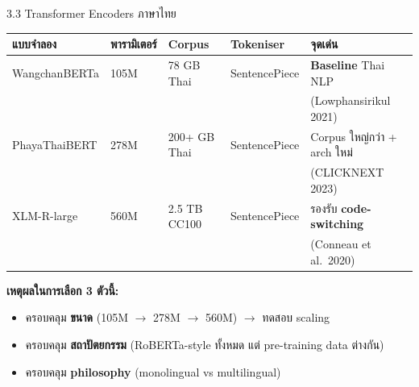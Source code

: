 \documentclass[aspectratio=169,11pt,xcolor=dvipsnames]{beamer}
\newcommand{\hl}[1]{\textcolor{kmitlOrange}{\textbf{#1}}}
\newcommand{\hlb}[1]{\textcolor{kmitlBlue}{\textbf{#1}}}
\begin{document}
\begin{frame}{3.3 Transformer Encoders ภาษาไทย}
  \footnotesize
  \begin{tabular}{p{2.6cm}p{1.6cm}p{1.8cm}p{1.8cm}p{4.5cm}}
    \toprule
    \textbf{แบบจำลอง} & \textbf{พารามิเตอร์} & \textbf{Corpus} & \textbf{Tokeniser} & \textbf{จุดเด่น}\\
    \midrule
    WangchanBERTa & 105M & 78 GB Thai & SentencePiece & \hlb{Baseline} Thai NLP\\
                  &      &            &               & (Lowphansirikul 2021)\\[0.3em]
    PhayaThaiBERT & 278M & 200+ GB Thai & SentencePiece & Corpus ใหญ่กว่า + arch ใหม่\\
                  &      &              &               & (CLICKNEXT 2023)\\[0.3em]
    XLM-R-large   & 560M & 2.5 TB CC100 & SentencePiece & รองรับ \hl{code-switching}\\
                  &      &              &               & (Conneau et al.\ 2020)\\
    \bottomrule
  \end{tabular}
  \vspace{0.6em}

  \textbf{เหตุผลในการเลือก 3 ตัวนี้:}
  \begin{itemize}
    \item ครอบคลุม \hl{ขนาด} (105M $\rightarrow$ 278M $\rightarrow$ 560M) $\rightarrow$ ทดสอบ scaling
    \item ครอบคลุม \hl{สถาปัตยกรรม} (RoBERTa-style ทั้งหมด แต่ pre-training data ต่างกัน)
    \item ครอบคลุม \hl{philosophy} (monolingual vs multilingual)
  \end{itemize}
\end{frame}
\end{document}
